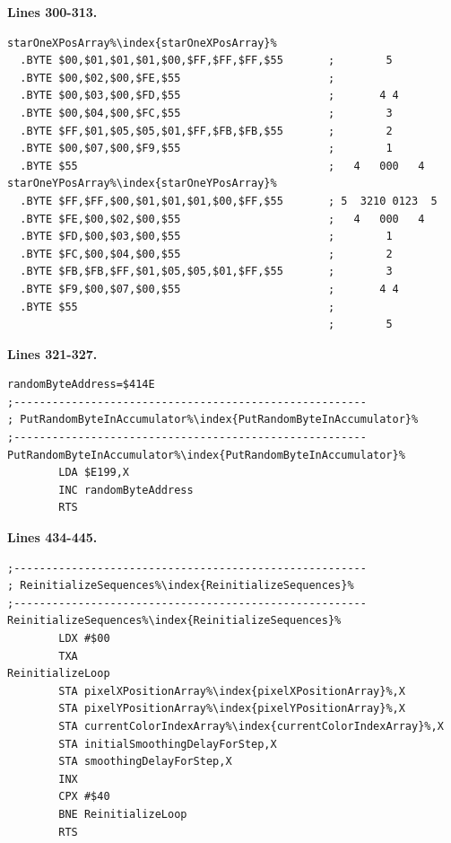\clearpage
\textbf{Lines 300-313. }
\begin{lstlisting}[caption = Hopefully this looks familiar.,escapechar=\%]
starOneXPosArray%\index{starOneXPosArray}%
  .BYTE $00,$01,$01,$01,$00,$FF,$FF,$FF,$55       ;        5       
  .BYTE $00,$02,$00,$FE,$55                       ;                
  .BYTE $00,$03,$00,$FD,$55                       ;       4 4      
  .BYTE $00,$04,$00,$FC,$55                       ;        3       
  .BYTE $FF,$01,$05,$05,$01,$FF,$FB,$FB,$55       ;        2       
  .BYTE $00,$07,$00,$F9,$55                       ;        1       
  .BYTE $55                                       ;   4   000   4  
starOneYPosArray%\index{starOneYPosArray}%
  .BYTE $FF,$FF,$00,$01,$01,$01,$00,$FF,$55       ; 5  3210 0123  5
  .BYTE $FE,$00,$02,$00,$55                       ;   4   000   4  
  .BYTE $FD,$00,$03,$00,$55                       ;        1       
  .BYTE $FC,$00,$04,$00,$55                       ;        2       
  .BYTE $FB,$FB,$FF,$01,$05,$05,$01,$FF,$55       ;        3       
  .BYTE $F9,$00,$07,$00,$55                       ;       4 4      
  .BYTE $55                                       ;                
                                                  ;        5       
\end{lstlisting}

\textbf{Lines 321-327. }
\begin{lstlisting}[caption= Random\, unused\, feels like a metaphor.,escapechar=\%]
randomByteAddress=$414E
;-------------------------------------------------------
; PutRandomByteInAccumulator%\index{PutRandomByteInAccumulator}%
;-------------------------------------------------------
PutRandomByteInAccumulator%\index{PutRandomByteInAccumulator}%   
        LDA $E199,X
        INC randomByteAddress
        RTS 
\end{lstlisting}
\textbf{Lines 434-445. }
\begin{lstlisting}[caption = Fill our pixel arrays with zeros.,escapechar=\%]
;-------------------------------------------------------
; ReinitializeSequences%\index{ReinitializeSequences}%
;-------------------------------------------------------
ReinitializeSequences%\index{ReinitializeSequences}%   
        LDX #$00
        TXA 
ReinitializeLoop   
        STA pixelXPositionArray%\index{pixelXPositionArray}%,X
        STA pixelYPositionArray%\index{pixelYPositionArray}%,X
        STA currentColorIndexArray%\index{currentColorIndexArray}%,X
        STA initialSmoothingDelayForStep,X
        STA smoothingDelayForStep,X
        INX 
        CPX #$40
        BNE ReinitializeLoop
        RTS 

\end{lstlisting}
\clearpage

